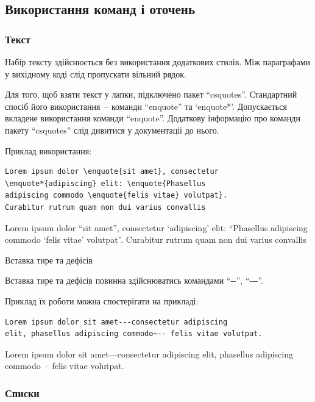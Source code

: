 \subsection{Використання команд і оточень}
\subsubsection{Текст}

Набір тексту здійснюється без використання додаткових стилів. Між параграфами
у вихідному коді слід пропускати вільний рядок.

Для того, щоб взяти текст у лапки, підключено пакет \enquote{csquotes}.
Стандартний спосіб його використання~-- команди \enquote{enquote} та
\enquote*{enquote*}. Допускається вкладене використання команди
\enquote{enquote}. Додаткову інформацію про команди пакету \enquote{csquotes}
слід дивитися у документації до нього.

Приклад використання:
\begin{framed}\small
\begin{lstlisting}
Lorem ipsum dolor \enquote{sit amet}, consectetur 
\enquote*{adipiscing} elit: \enquote{Phasellus 
adipiscing commodo \enquote{felis vitae} volutpat}. 
Curabitur rutrum quam non dui varius convallis
\end{lstlisting}
\end{framed}

Lorem ipsum dolor \enquote{sit amet}, consectetur \enquote*{adipiscing} elit:
\enquote{Phasellus adipiscing commodo \enquote{felis vitae} volutpat}. Curabitur
rutrum quam non dui varius convallis

Вставка тире та дефісів

Вставка тире та дефісів повинна здійснюватись командами
\enquote{-{}-}, \enquote{-{}-{}-}.

Приклад їх роботи можна спостерігати на прикладі:

\begin{framed}\small
\begin{lstlisting}
Lorem ipsum dolor sit amet---consectetur adipiscing
elit, phasellus adipiscing commodo~-- felis vitae volutpat.
\end{lstlisting}
\end{framed}

Lorem ipsum dolor sit amet---consectetur adipiscing elit, phasellus adipiscing
commodo~-- felis vitae volutpat.

\subsubsection{Списки}

